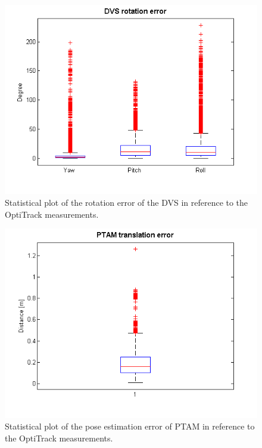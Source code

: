 \begin{figure}[h]
     \centering
     \includegraphics[width=1.0\textwidth]{img/dvs_rot_error_box.png}
     \caption{Statistical plot of the rotation error of the DVS in reference to the OptiTrack measurements.}
     \label{img:dvs_rot_error_plot}
\end{figure}

\begin{figure}[h]
     \centering
     \includegraphics[width=1.0\textwidth]{img/ptam_trans_error_box.png}
     \caption{Statistical plot of the pose estimation error of PTAM in reference to the OptiTrack measurements.}
     \label{img:ptam_pose_error_plot}
\end{figure}

